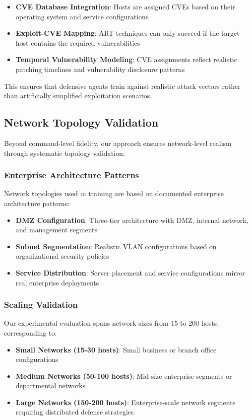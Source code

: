 \begin{itemize}
    \item \textbf{CVE Database Integration}: Hosts are assigned CVEs based on their operating system and service configurations
    \item \textbf{Exploit-CVE Mapping}: ART techniques can only succeed if the target host contains the required vulnerabilities
    \item \textbf{Temporal Vulnerability Modeling}: CVE assignments reflect realistic patching timelines and vulnerability disclosure patterns
\end{itemize}

This ensures that defensive agents train against realistic attack vectors rather than artificially simplified exploitation scenarios.

\subsection{Network Topology Validation}

Beyond command-level fidelity, our approach ensures network-level realism through systematic topology validation:

\subsubsection{Enterprise Architecture Patterns}

Network topologies used in training are based on documented enterprise architecture patterns:

\begin{itemize}
    \item \textbf{DMZ Configuration}: Three-tier architecture with DMZ, internal network, and management segments
    \item \textbf{Subnet Segmentation}: Realistic VLAN configurations based on organizational security policies
    \item \textbf{Service Distribution}: Server placement and service configurations mirror real enterprise deployments
\end{itemize}

\subsubsection{Scaling Validation}

Our experimental evaluation spans network sizes from 15 to 200 hosts, corresponding to:
\begin{itemize}
    \item \textbf{Small Networks (15-30 hosts)}: Small business or branch office configurations
    \item \textbf{Medium Networks (50-100 hosts)}: Mid-size enterprise segments or departmental networks  
    \item \textbf{Large Networks (150-200 hosts)}: Enterprise-scale network segments requiring distributed defense strategies
\end{itemize}

